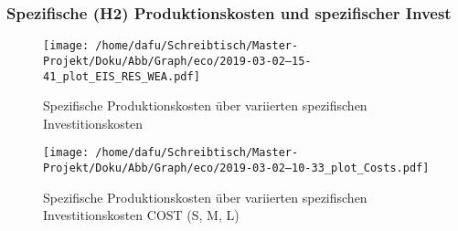 \documentclass[onecolumn,10pt,titlepage]{article}
\begin{document}
\subsubsection{Spezifische (H2) Produktionskosten und spezifischer Invest}
\begin{figure}[H]

	\centering
	\texttt{[image: /home/dafu/Schreibtisch/Master-Projekt/Doku/Abb/Graph/eco/2019-03-02--15-41\_plot\_EIS\_RES\_WEA.pdf]}
	\caption[{Spezifische Produktionskosten; variierte Investitionskosten EIS, RES, WEA}]{Spezifische Produktionskosten über variierten spezifischen Investitionskosten }
	\label{fig:analy_ecoVAls_all}
\end{figure}

\begin{figure}[H]

	\centering
	\texttt{[image: /home/dafu/Schreibtisch/Master-Projekt/Doku/Abb/Graph/eco/2019-03-02--10-33\_plot\_Costs.pdf]}
	\caption[Spezifische Produktionskosten; variierte Investitionskosten COST]{Spezifische Produktionskosten über variierten spezifischen Investitionskosten COST (S, M, L)}
	\label{fig:analy_ecoVAls_COST}
\end{figure}
\end{document}
